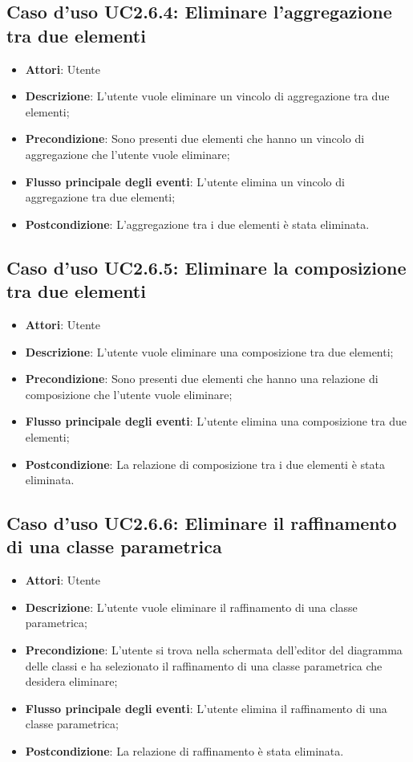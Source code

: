 \documentclass[../AnalisiDeiRequisiti.tex]{subfiles}
\begin{document}
		\subsection{Caso d'uso UC2.6.4: Eliminare l'aggregazione tra due elementi}
		\begin{itemize}
			\item \textbf{Attori}: Utente
			\item \textbf{Descrizione}: L'utente vuole eliminare un vincolo di aggregazione tra due elementi;
			\item \textbf{Precondizione}: Sono presenti due elementi che hanno un vincolo di aggregazione che l'utente vuole eliminare;
			\item \textbf{Flusso principale degli eventi}: L'utente elimina un vincolo di aggregazione tra due elementi;
			\item \textbf{Postcondizione}: L'aggregazione tra i due elementi è stata eliminata.
		\end{itemize}
		\subsection{Caso d'uso UC2.6.5: Eliminare la composizione tra due elementi}
		\begin{itemize}
			\item \textbf{Attori}: Utente
			\item \textbf{Descrizione}: L'utente vuole eliminare una composizione tra due elementi;
			\item \textbf{Precondizione}: Sono presenti due elementi che hanno una relazione di composizione che l'utente vuole eliminare;
			\item \textbf{Flusso principale degli eventi}: L'utente elimina una composizione tra due elementi;
			\item \textbf{Postcondizione}: La relazione di composizione tra i due elementi è stata eliminata.
		\end{itemize}
		\subsection{Caso d'uso UC2.6.6: Eliminare il raffinamento di una classe parametrica}
		\begin{itemize}
			\item \textbf{Attori}: Utente
			\item \textbf{Descrizione}: L'utente vuole eliminare il raffinamento di una classe parametrica;
			\item \textbf{Precondizione}: L'utente si trova nella schermata dell'editor del diagramma delle classi e ha selezionato il raffinamento di una classe parametrica che desidera eliminare;
			\item \textbf{Flusso principale degli eventi}: L'utente elimina il raffinamento di una classe parametrica;
			\item \textbf{Postcondizione}: La relazione di raffinamento è stata eliminata.
		\end{itemize}
\end{document}
